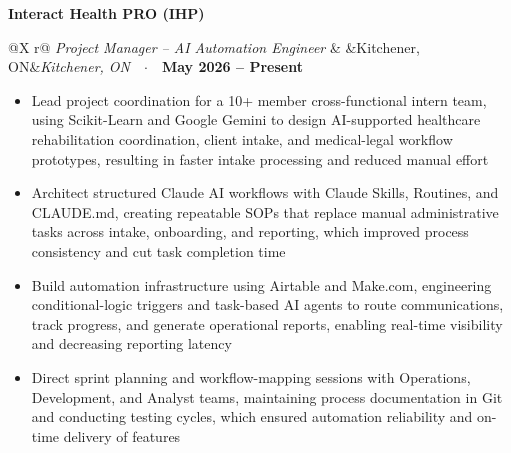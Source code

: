 \documentclass[letterpaper,10pt]{article}
\makeatletter
\newcommand{\org}[1]{\vspace{2pt}\textbf{#1}\par\vspace{-1pt}}
\newcommand{\role}[3]{%
  \begin{tabularx}{\textwidth}{@{}X r@{}}
    \textit{#1} & \ifx&#2&\else\textit{#2}\ \ $\cdot$\ \ \fi\textbf{#3}\\
  \end{tabularx}\vspace{-3pt}}
\makeatother
\begin{document}
\org{Interact Health PRO (IHP)}
\role{Project Manager -- AI Automation Engineer}{Kitchener, ON}{May 2026 -- Present}
\begin{itemize}
  \item Lead project coordination for a 10+ member cross-functional intern team, using Scikit-Learn and Google Gemini to
        design AI-supported healthcare rehabilitation coordination, client intake, and medical-legal workflow prototypes,
        resulting in faster intake processing and reduced manual effort
  \item Architect structured Claude AI workflows with Claude Skills, Routines, and CLAUDE.md, creating repeatable SOPs that
        replace manual administrative tasks across intake, onboarding, and reporting, which improved process consistency
        and cut task completion time
  \item Build automation infrastructure using Airtable and Make.com, engineering conditional-logic triggers and task-based
        AI agents to route communications, track progress, and generate operational reports, enabling real-time
        visibility and decreasing reporting latency
  \item Direct sprint planning and workflow-mapping sessions with Operations, Development, and Analyst teams, maintaining
        process documentation in Git and conducting testing cycles, which ensured automation reliability and on-time
        delivery of features
\end{itemize}
\end{document}
